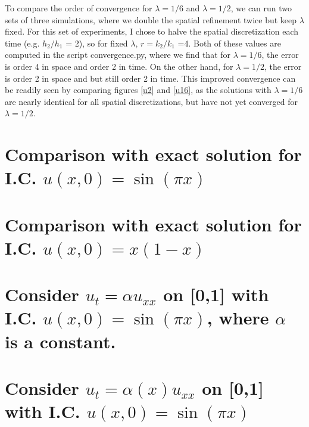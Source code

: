\documentclass[11pt]{amsart}
\begin{document}
To compare the order of convergence for $\lambda = 1/6$ and $\lambda = 1/2$, we can run two sets of  three simulations, where we double the spatial refinement twice but keep $ \lambda$ fixed. 
For this set of experiments, I chose to halve the spatial discretization each time (e.g. $h_2/h_1$ = 2), so for fixed $\lambda$,  $r =k_2/k_1$ =4. Both of these values are computed in the script convergence.py, where we find that for $\lambda = 1/6$, the error is order 4 in space and order 2 in time. On the other hand, for $\lambda =1/2$,   the error is order 2 in space and  but still order 2 in time. This improved convergence can be readily seen by comparing figures \ref{u2} and \ref{u16}, as the solutions with $\lambda =1/6$ are nearly identical for all spatial discretizations, but have not yet converged for $\lambda = 1/2$.

\section{Comparison with exact solution for  I.C. $u(x,0)= \sin(\pi x)$} 

\section{Comparison with exact solution for  I.C. $u(x,0)= x(1-x)$} 

\section{Consider $u_t = \alpha u_{xx}$ on [0,1] with I.C. $u(x,0)= \sin(\pi x)$, where $\alpha$ is a constant. }


\section{Consider $u_t = \alpha(x) u_{xx}$ on [0,1] with I.C. $u(x,0)= \sin(\pi x)$ }
\end{document}
